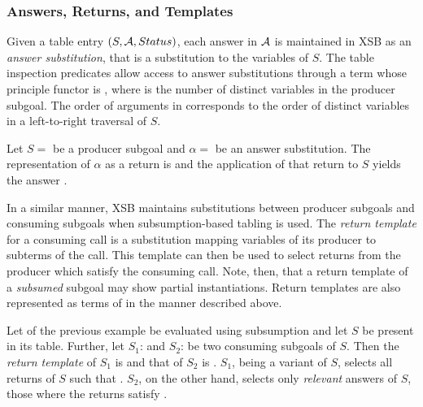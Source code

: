 
\subsubsection*{Answers, Returns, and Templates}

Given a table entry $(S,{\cal A},Status)$, each answer in ${\cal A}$ is
maintained in XSB as an {\em answer substitution}, that is a
substitution to the variables of $S$\@.  The table inspection predicates
allow access to answer substitutions through a term whose principle
functor is \retn, where  is the number of distinct variables
in the producer subgoal.  The order of arguments in \retn{}
corresponds to the order of distinct variables in a left-to-right
traversal of $S$.

\begin{example}
Let $S =$  be a producer subgoal and $\alpha =$
 be an answer substitution.  The representation of
$\alpha$ as a return is  and the application of that
return to $S$ yields the answer .\fillBox
\end{example}

In a similar manner, XSB maintains substitutions between producer
subgoals and consuming subgoals when subsumption-based tabling is
used.  The \emph{return template} for a consuming call is a
substitution mapping variables of its producer to subterms of the
call.  This template can then be used to select returns from the
producer which satisfy the consuming call.  Note, then, that a return
template of a \emph{subsumed} subgoal may show partial instantiations.
Return templates are also represented as terms of \retn in the manner
described above.

\begin{example}
Let  of the previous example be evaluated using subsumption
and let $S$ be present in its table.  Further, let $S_1$:
 and $S_2$:  be two consuming
subgoals of $S$\@.  Then the \emph{return template} of $S_1$ is
 and that of $S_2$ is .  $S_1$, being
a variant of $S$, selects all returns of $S$ such that
\@.  $S_2$, on the other hand, selects only
\emph{relevant} answers of $S$, those where the returns satisfy
.\fillBox
\end{example}


